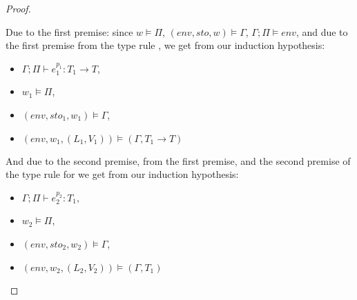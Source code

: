 \documentclass[../../master.tex]{subfiles}
\begin{document}
\begin{proof}
\begin{description}
			Due to the first premise: since $w\models\Pi$, $(env,sto,w)\models\Gamma$, $\Gamma;\Pi\models env$, and due to the first premise from the type rule , we get from our induction hypothesis:
			\begin{itemize}
				\item $\Gamma;\Pi\vdash e_1^{p_1}:T_1\rightarrow T$,
				\item $w_1\models\Pi$,
				\item $(env,sto_1,w_1)\models\Gamma$,
				\item $(env,w_1,(L_1,V_1))\models(\Gamma,T_1\rightarrow T)$
			\end{itemize}
			And due to the second premise, from the first premise, and the second premise of the type rule for  we get from our induction hypothesis:
			\begin{itemize}
				\item $\Gamma;\Pi\vdash e_2^{p_2}:T_1$,
				\item $w_2\models\Pi$,
				\item $(env,sto_2,w_2)\models\Gamma$,
				\item $(env,w_2,(L_2,V_2))\models(\Gamma,T_1)$
			\end{itemize}


\end{description}
\end{proof}
\end{document}
